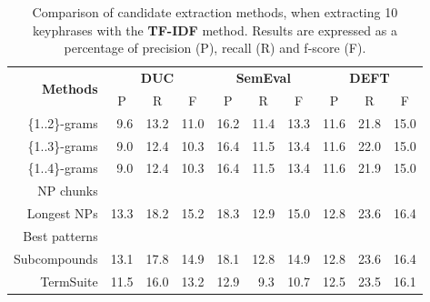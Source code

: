     \begin{table}[h]
      \centering
      \begin{tabular}{rccccccccc}
        \toprule
        \multirow{2}{*}[-2pt]{\textbf{Methods}} & \multicolumn{3}{c}{\textbf{DUC}} & \multicolumn{3}{c}{\textbf{SemEval}} & \multicolumn{3}{c}{\textbf{DEFT}}\\
        \cmidrule(r){2-4}\cmidrule(lr){5-7}\cmidrule(l){8-10}
        & P & R & F & P & R & F & P & R & F\\
        \midrule
        \{1..2\}-grams & ${~~}$9.6 & 13.2 & 11.0 & 16.2 & 11.4 & 13.3 & 11.6 & 21.8 & 15.0\\
        \{1..3\}-grams & ${~~}$9.0 & 12.4 & 10.3 & 16.4 & 11.5 & 13.4 & 11.6 & 22.0 & 15.0\\
        \{1..4\}-grams & ${~~}$9.0 & 12.4 & 10.3 & 16.4 & 11.5 & 13.4 & 11.6 & 21.9 & 15.0\\
        NP chunks & & & & & & & & & \\
        Longest NPs & 13.3 & 18.2 & 15.2 & 18.3 & 12.9 & 15.0 & 12.8 & 23.6 & 16.4\\
        Best patterns & & & & & & & & & \\
        Subcompounds & 13.1 & 17.8 & 14.9 &18.1 & 12.8 & 14.9 & 12.8 & 23.6 & 16.4\\
        TermSuite & 11.5 & 16.0 & 13.2 & 12.9 & ${~~}$9.3 & 10.7 & 12.5 & 23.5 & 16.1\\
        \bottomrule
      \end{tabular}
      \caption{Comparison of candidate extraction methods, when extracting 10
               keyphrases with the \textbf{TF-IDF} method. Results are expressed
               as a percentage of precision (P), recall (R) and f-score (F).
               \label{tab:keyphrase_extraction_results}}
    \end{table}

